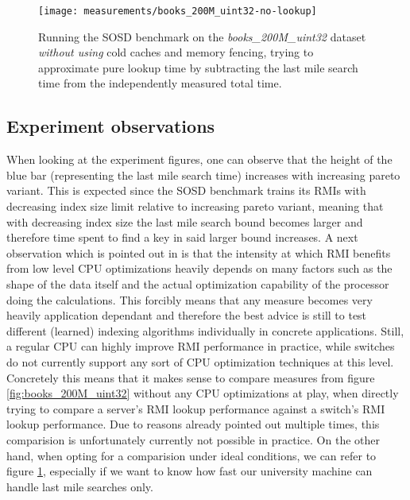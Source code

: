 \captionsetup[figure]{skip=10pt} %
\begin{figure}[!ht]
  \centering
  \texttt{[image: measurements/books\_200M\_uint32-no-lookup]}
  \caption[Last mile search time measures and lookup time approximation \emph{without using} cold caches and memory fencing]{
    Running the SOSD benchmark on the \emph{books\_200M\_uint32} dataset \emph{without using} cold caches and memory fencing, trying to approximate pure lookup time by subtracting the last mile search time from the independently measured total time.
  }
  \label{fig:books_200M_uint32-no-lookup}
\end{figure}

\subsection{Experiment observations}
When looking at the experiment figures, one can observe that the height of the blue bar (representing the last mile search time) increases with increasing pareto variant. This is expected since the SOSD benchmark trains its RMIs with decreasing index size limit relative to increasing pareto variant, meaning that with decreasing index size the last mile search bound becomes larger and therefore time spent to find a key in said larger bound increases. A next observation which is pointed out in \cite{sosd-vldb} is that the intensity at which RMI benefits from low level CPU optimizations heavily depends on many factors such as the shape of the data itself and the actual optimization capability of the processor doing the calculations. This forcibly means that any measure becomes very heavily application dependant and therefore the best advice is still to test different (learned) indexing algorithms individually in concrete applications. Still, a regular CPU can highly improve RMI performance in practice, while switches do not currently support any sort of CPU optimization techniques at this level. Concretely this means that it makes sense to compare measures from figure \ref{fig:books_200M_uint32} without any CPU optimizations at play, when directly trying to compare a server's RMI lookup performance against a switch's RMI lookup performance. Due to reasons already pointed out multiple times, this comparision is unfortunately currently not possible in practice. On the other hand, when opting for a comparision under ideal conditions, we can refer to figure \ref{fig:books_200M_uint32-no-lookup}, especially if we want to know how fast our university machine can handle last mile searches only.


